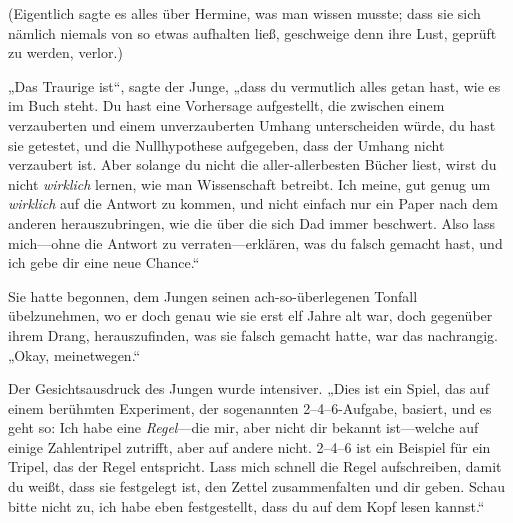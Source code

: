 (Eigentlich sagte es alles über Hermine, was man wissen musste; dass sie sich nämlich niemals von so etwas aufhalten ließ, geschweige denn ihre Lust, geprüft zu werden, verlor.)

„Das Traurige ist“, sagte der Junge, „dass du vermutlich alles getan hast, wie es im Buch steht. Du hast eine Vorhersage aufgestellt, die zwischen einem verzauberten und einem unverzauberten Umhang unterscheiden würde, du hast sie getestet, und die Nullhypothese aufgegeben, dass der Umhang nicht verzaubert ist. Aber solange du nicht die aller-allerbesten Bücher liest, wirst du nicht \emph{wirklich} lernen, wie man Wissenschaft betreibt. Ich meine, gut genug um \emph{wirklich} auf die Antwort zu kommen, und nicht einfach nur ein Paper nach dem anderen herauszubringen, wie die über die sich Dad immer beschwert. Also lass mich—ohne die Antwort zu verraten—erklären, was du falsch gemacht hast, und ich gebe dir eine neue Chance.“

Sie hatte begonnen, dem Jungen seinen ach-so-überlegenen Tonfall übelzunehmen, wo er doch genau wie sie erst elf Jahre alt war, doch gegenüber ihrem Drang, herauszufinden, was sie falsch gemacht hatte, war das nachrangig. „Okay, meinetwegen.“

Der Gesichtsausdruck des Jungen wurde intensiver. „Dies ist ein Spiel, das auf einem berühmten Experiment, der sogenannten 2–4–6-Aufgabe, basiert, und es geht so: Ich habe eine \emph{Regel}—die mir, aber nicht dir bekannt ist—welche auf einige Zahlentripel zutrifft, aber auf andere nicht. 2–4–6 ist ein Beispiel für ein Tripel, das der Regel entspricht. Lass mich schnell die Regel aufschreiben, damit du weißt, dass sie festgelegt ist, den Zettel zusammenfalten und dir geben. Schau bitte nicht zu, ich habe eben festgestellt, dass du auf dem Kopf lesen kannst.“

